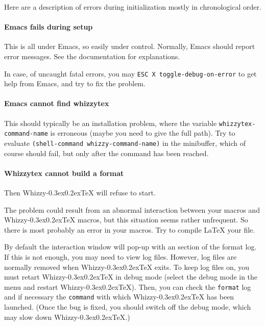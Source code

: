\documentclass[12pt]{article}
\makeatletter
\let \lst \verb
\def \whizzy {{Whizzy\kern -0.3ex\raise 0.2ex\hbox{\let \@\relax\TeX}}}
\makeatother
\begin{document}
Here are a description of errors during initialization mostly in
chronological order. 

\paragraph {Emacs fails during setup}

This is all under Emacs, so easily under control.
Normally, Emacs should report error messages. See the documentation for
explanations. 

In case, of uncaught fatal errors, you may
\verb"ESC X toggle-debug-on-error" to get help from Emacs, and try to fix
the problem. 

\paragraph {Emacs cannot find whizzytex}

This should typically be an installation problem, where the variable
\lst"whizzytex-command-name" is erroneous (maybe you need to give the full
path). Try to evaluate \verb"(shell-command whizzy-command-name)" in the
minibuffer, which of course should fail, but only after the command has been
reached.

\paragraph {Whizzytex cannot build a format}

Then {\whizzy} will refuse to start. 

The problem could result from an abnormal interaction between your macros
and {\whizzy} macros, but this situation seems rather unfrequent.  So there
is most probably an error in your macros.  Try to compile {\LaTeX} your
file.  



By default the interaction window will pop-up with an section of the format
log. If this is not enough, you may need to view log files.  However, log
files are normally removed when {\whizzy} exits.  To keep log files on,
you must retart {\whizzy} in debug mode (select the debug mode in the
menu and restart {\whizzy}). Then, you can check the \lst"format" log and
if necessary the \lst"command" with which {\whizzy} has been launched.
(Once the bug is fixed, you should switch off the debug mode, which may slow
down {\whizzy}.)
\end{document}
